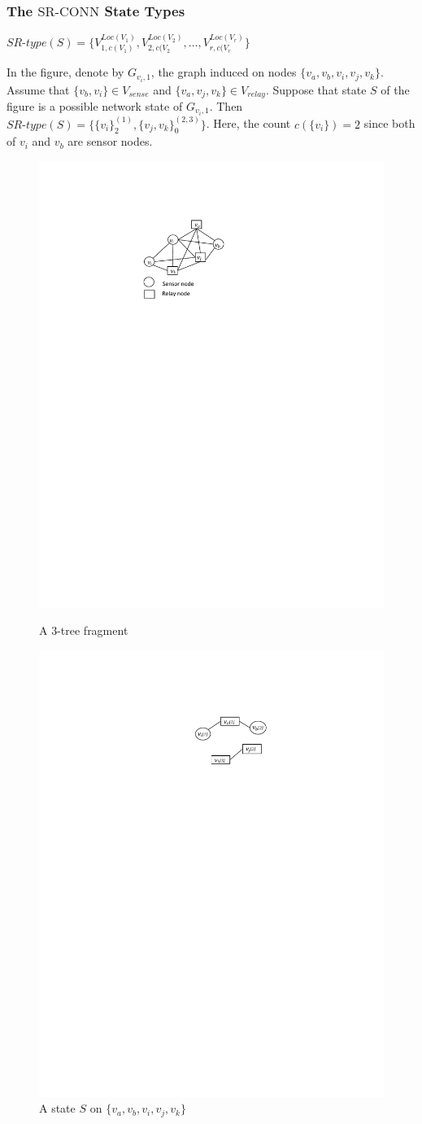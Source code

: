 \documentclass{beamer}
\newcommand{\SRCONN}   { {\mathrm {SR\mbox{-}CONN}} }
\begin{document}
\begin{frame}
\frametitle{The $\SRCONN$ State Types}


\centerline{
$SR\mbox{-}type(S)=\{V_{1,c(V_1)}^{Loc(V_1)}, V_{2,c(V_2}^{Loc(V_2)}, \ldots, V^{Loc(V_r)}_{r,c(V_r} \}$}

\begin{example}
\normalfont
 In the figure, denote by  $G_{v_i,1}$, the graph induced on nodes $\{v_a,v_b,v_i,v_j,v_k\}$. Assume that $\{v_b,v_i\}\in V_{sense}$ and $\{v_a,v_j,v_k\} \in V_{relay}$. Suppose that state $S$ of the figure is a possible network state of $G_{v_i,1}$. Then $SR\mbox{-}type(S)=\big \{\{v_i\}_2^{(1)},\{v_j,v_k\}_0^{(2,3)}\big\}$. Here, the count $c(\{v_i\})=2$ since both of $v_i$ and $v_b$ are sensor nodes.
 
\end{example}
\vspace*{-0.4 cm}
\begin{figure}[!htb]
\begin{minipage}[]{0.45\linewidth}
\includegraphics[width=1.5 in, height=1 in]{Ch5f3.pdf}
\caption{A 3-tree fragment}
\label{fig:sttype2}
\end{minipage}
\begin{minipage}{0.45\linewidth}
\includegraphics[width=1.2 in, height=1 in]{Ch5f3_1.pdf}
\caption{A state $S$ on $\{v_a,v_b,v_i,v_j,v_k\}$}
\label{fig:sttype2_node}
\end{minipage}
\end{figure}

\end{frame}
\end{document}

